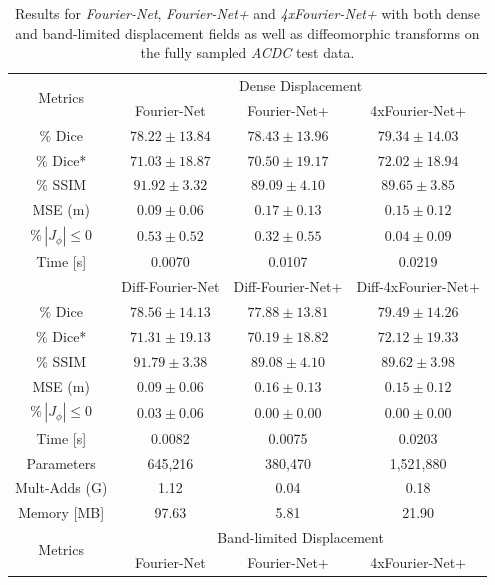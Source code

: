 \documentclass[english,version-2022-01]{uzl-thesis} %
\begin{document}
\begin{table}[H] %
	\centering
	\caption{Results for \emph{Fourier-Net}, \emph{Fourier-Net+} and \emph{4xFourier-Net+} with both dense and band-limited displacement fields as well as diffeomorphic transforms on the fully sampled \emph{ACDC} test data.}
	\label{tab:Fourier-NetvsFourier-Net+ACDC}
	\begin{tabular}{c c c c} %
		\toprule
		\multirow{2}{*}{Metrics} & \multicolumn{3}{c}{Dense Displacement} \\
		\cline{2-4} 
		 & Fourier-Net & Fourier-Net+ & 4xFourier-Net+\\	
		\midrule
		$\%$ Dice & $78.22 \pm 13.84$ & $78.43 \pm 13.96$ & $79.34 \pm 14.03$\\
		$\%$ Dice* & $71.03 \pm 18.87$ & $70.50 \pm 19.17$ & $72.02 \pm 18.94$ \\
		$\%$ SSIM & $91.92 \pm 3.32$ & $89.09 \pm 4.10$ & $89.65 \pm 3.85$\\
		MSE (m) & $0.09 \pm 0.06$ & $0.17 \pm 0.13$ & $0.15 \pm 0.12$ \\
		$\% \, |J_{\phi}|\leq0$ & $0.53 \pm 0.52$ & $0.32 \pm 0.55$ & $0.04 \pm 0.09$ \\
		Time [s] 	  & 0.0070 	& 0.0107 	& 0.0219 \\
		\midrule
		 & Diff-Fourier-Net & Diff-Fourier-Net+ & Diff-4xFourier-Net+\\		
		\midrule
		$\%$ Dice & $78.56 \pm 14.13$ & $77.88 \pm 13.81$ & $79.49 \pm 14.26$\\
		$\%$ Dice* & $71.31 \pm 19.13$ & $70.19 \pm 18.82$ & $72.12 \pm 19.33$ \\
		$\%$ SSIM & $91.79 \pm 3.38$ & $89.08 \pm 4.10$ & $89.62 \pm 3.98$\\
		MSE (m) & $0.09 \pm 0.06$ & $0.16 \pm 0.13$ & $0.15 \pm 0.12$ \\
		$\% \, |J_{\phi}|\leq0$ & $0.03 \pm 0.06$ & $0.00 \pm 0.00$ & $0.00 \pm 0.00$ \\
		Time [s] 	  & 0.0082  & 0.0075 & 0.0203 \\
		\midrule
		Parameters    & 645,216 	& 380,470 	& 1,521,880 \\
		Mult-Adds (G) & 1.12  	& 0.04  		& 0.18 \\
		Memory [MB]   & 97.63   	& 5.81   	& 21.90 \\
		\midrule
		\multirow{2}{*}{Metrics} & \multicolumn{3}{c}{Band-limited Displacement} \\
		\cline{2-4} 
		 & Fourier-Net & Fourier-Net+ & 4xFourier-Net+\\		

\end{tabular}
\end{table}
\end{document}
